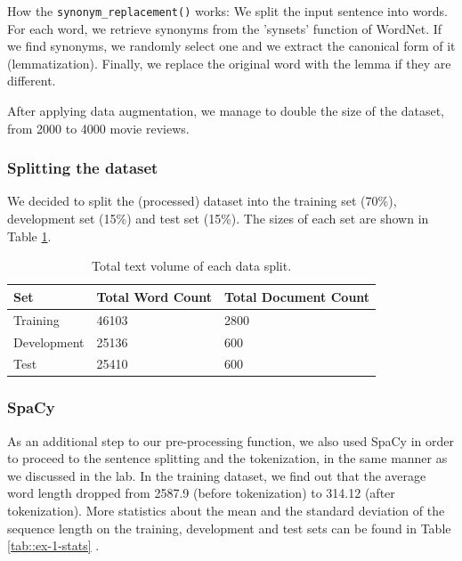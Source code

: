 \documentclass[10pt, a4paper]{article}
\begin{document}
        How the \texttt{synonym\_replacement()} works: We split the input sentence into words. For each word, we retrieve synonyms from the 'synsets' function of WordNet. If we find synonyms, we randomly select one and we extract the canonical form of it (lemmatization). Finally, we replace the original word with the lemma if they are different.

        After applying data augmentation, we manage to double the size of the dataset, from 2000 to 4000 movie reviews. 

        
	
	\subsubsection{Splitting the dataset}
	We decided to split the (processed) dataset into the training set (70\%), development set (15\%) and test set (15\%). The sizes of each set are shown in Table \ref{tab::ex-9-stats}.
	
	\begin{table}
		\begin{tabular}{|l|l|l|}
			\hline
			\cellcolor{blue!25}\textbf{Set} & \cellcolor{blue!25}\textbf{Total Word Count} &
			\cellcolor{blue!25}\textbf{Total Document Count}\\
			\hline
			Training & 46103 & 2800 \\\hline
			Development & 25136  & 600 \\\hline
			Test & 25410 & 600 \\\hline
		\end{tabular}
		\centering
		\caption{Total text volume of each data split.}
		\label{tab::ex-9-stats}
	\end{table}
	
	
	\subsubsection{SpaCy}
	As an additional step to our pre-processing function, we also used SpaCy in order to proceed to the sentence splitting and the tokenization, in the same manner as we discussed in the lab. In the training dataset, we find out that the average word length dropped from 2587.9 (before tokenization) to 314.12 (after tokenization). More statistics about the mean and the standard deviation of the sequence length on the training, development and test sets can be found in Table \ref{tab::ex-1-stats} .
	
\end{document}
